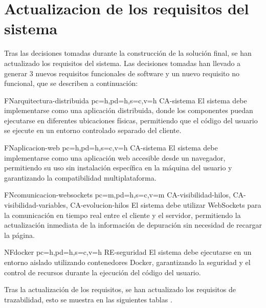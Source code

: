 \section{Actualizacion de los requisitos del sistema} \label{sec:actualizacion-requisitos}
Tras las decisiones tomadas durante la construcción de la solución final, se han actualizado los requisitos del sistema. Las decisiones tomadas han llevado a generar 3 nuevos requisitos funcionales de software y un nuevo requisito no funcional, que se describen a continuación:

\begin{softwareReq}{FN}{arquitectura-distribuida}
    {pc=h,pd=h,s=c,v=h}
    {CA-sistema}
    El sistema debe implementarse como una aplicación distribuida, donde los componentes puedan ejecutarse en diferentes ubicaciones físicas, permitiendo que el código del usuario se ejecute en un entorno controlado separado del cliente.
\end{softwareReq}

\begin{softwareReq}{FN}{aplicacion-web}
    {pc=h,pd=h,s=c,v=h}
    {CA-sistema}
    El sistema debe implementarse como una aplicación web accesible desde un navegador, permitiendo su uso sin instalación específica en la máquina del usuario y garantizando la compatibilidad multiplataforma.
\end{softwareReq}

\begin{softwareReq}{FN}{comunicacion-websockets}
    {pc=m,pd=h,s=c,v=m}
    {CA-visibilidad-hilos, CA-visibilidad-variables, CA-evolucion-hilos}
    El sistema debe utilizar WebSockets para la comunicación en tiempo real entre el cliente y el servidor, permitiendo la actualización inmediata de la información de depuración sin necesidad de recargar la página.
\end{softwareReq}

\begin{softwareReq}{NF}{docker}
    {pc=h,pd=h,s=c,v=h}
    {RE-seguridad}
    El sistema debe ejecutarse en un entorno aislado utilizando contenedores Docker, garantizando la seguridad y el control de recursos durante la ejecución del código del usuario.
\end{softwareReq}

Tras la actualización de los requisitos, se han actualizado los requisitos de trazabilidad, esto se muestra en las siguientes tablas  .


\begin{table}[htb]
      {\traceabilityFNCA}
  \end{table}

